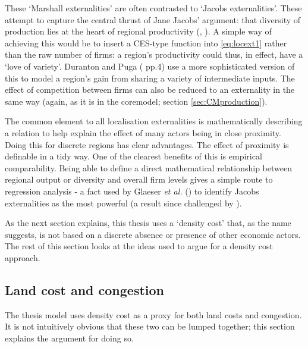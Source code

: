 {These `Marshall externalities' are often contrasted to `Jacobs externalities'. These attempt to capture the central thrust of Jane Jacobs' argument: that diversity of production lies at the heart of regional productivity (\citealt{jacobs_economy_1970}, \citeyear{jacobs_cities_1986}). A simple way of achieving this would be to insert a CES-type function into \eqref{eq:locext1} rather than the raw number of firms: a region's productivity could thus, in effect, have a `love of variety'. Duranton and Puga (\citeyear{duranton_micro-foundations_2003} pp.4) use a more sophisticated version of this to model a region's gain from sharing a variety of intermediate inputs. The effect of competition between firms can also be reduced to an externality in the same way (again, as it is in the \gls{coremodel}; section \ref{sec:CMproduction}).

The common element to all localisation externalities is mathematically describing a relation to help explain the effect of many actors being in close proximity. Doing this for discrete regions has clear advantages. The effect of proximity is definable in a tidy way. One of the clearest benefits of this is empirical comparability. Being able to define a direct mathematical relationship between regional output or diversity and overall firm levels gives a simple route to regression analysis - a fact used by Glaeser \emph{et al.} (\citeyear{glaeser_growth_1992}) to identify Jacobs externalities as the most powerful (a result since challenged by \citealt{van_der_panne_agglomeration_2004}). 

As the next section explains, this thesis uses a `density cost' that, as the name suggests, is not based on a discrete absence or presence of other economic actors. The rest of this section looks at the ideas used to argue for a density cost approach. 

\subsection{Land cost and congestion \label{sec:landcostcong}}

The thesis model uses density cost as a proxy for both land costs and congestion. It is not intuitively obvious that these two can be lumped together; this section explains the argument for doing so.

}

